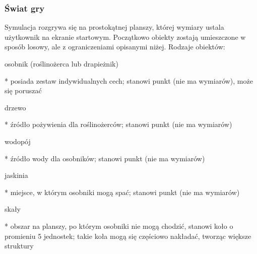 \subsubsection*{Świat gry}

Symulacja rozgrywa się na prostokątnej planszy, której wymiary ustala użytkownik na ekranie startowym. Początkowo obiekty zostają umieszczone w sposób losowy, ale z ograniczeniami opisanymi niżej. Rodzaje obiektów\-:


\begin{DoxyItemize}
\item osobnik (roślinożerca lub drapieżnik) \begin{DoxyVerb}  * posiada zestaw indywidualnych cech; stanowi punkt (nie ma wymiarów), może się poruszać
\end{DoxyVerb}

\end{DoxyItemize}


\begin{DoxyItemize}
\item drzewo \begin{DoxyVerb}  * źródło pożywienia dla roślinożerców; stanowi punkt (nie ma wymiarów) 
\end{DoxyVerb}

\end{DoxyItemize}


\begin{DoxyItemize}
\item wodopój \begin{DoxyVerb}  * źródło wody dla osobników; stanowi punkt (nie ma wymiarów) 
\end{DoxyVerb}

\end{DoxyItemize}


\begin{DoxyItemize}
\item jaskinia \begin{DoxyVerb}  * miejsce, w którym osobniki mogą spać; stanowi punkt (nie ma wymiarów) 
\end{DoxyVerb}

\end{DoxyItemize}


\begin{DoxyItemize}
\item skały \begin{DoxyVerb}  * obszar na planszy, po którym osobniki nie mogą chodzić, stanowi koło o promieniu 5 jednostek; takie koła mogą się częściowo nakładać, tworząc większe struktury
\end{DoxyVerb}

\end{DoxyItemize}

